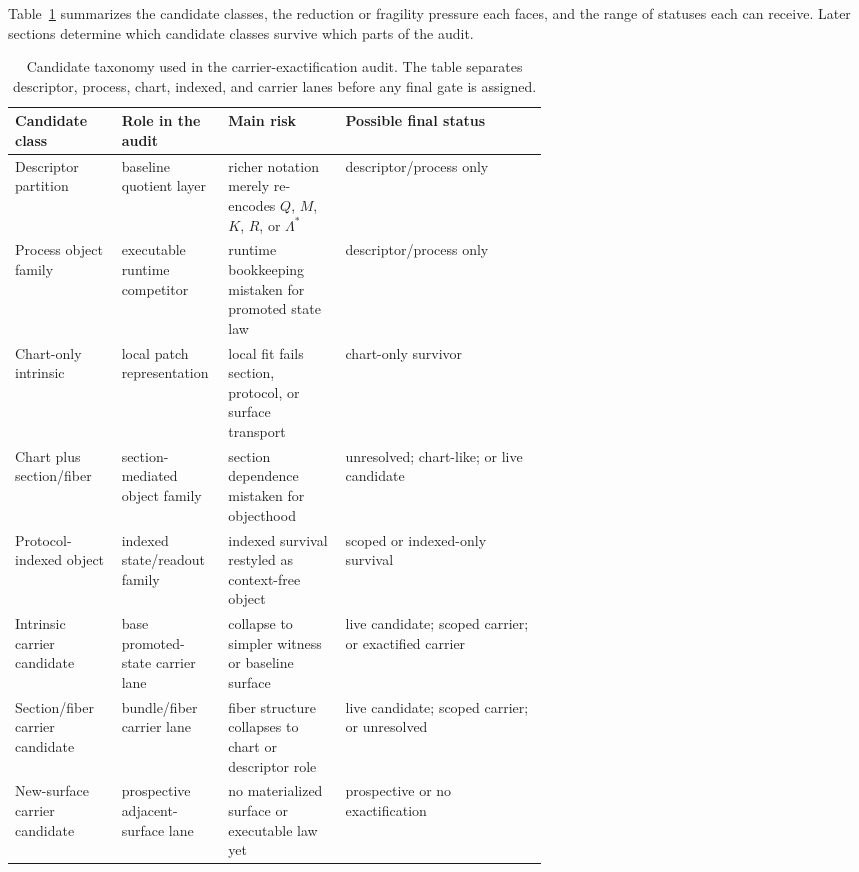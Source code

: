 \documentclass[11pt]{article}
\theoremstyle{definition}
\begin{document}
Table~\ref{tab:candidate-taxonomy} summarizes the candidate classes, the reduction or
fragility pressure each faces, and the range of statuses each can receive. Later
sections determine which candidate classes survive which parts of the audit.

\begin{table}[t]
\centering
\small
\caption{Candidate taxonomy used in the carrier-exactification audit. The table
separates descriptor, process, chart, indexed, and carrier lanes before any final gate
is assigned.}
\label{tab:candidate-taxonomy}
\begin{tabularx}{\linewidth}{@{}>{\raggedright\arraybackslash}p{0.20\linewidth}>{\raggedright\arraybackslash}p{0.20\linewidth}>{\raggedright\arraybackslash}p{0.22\linewidth}>{\raggedright\arraybackslash}X@{}}
\toprule
Candidate class & Role in the audit & Main risk & Possible final status \\
\midrule
Descriptor partition & baseline quotient layer & richer notation merely re-encodes $Q$, $M$, $K$, $R$, or $\Lambda^\ast$ & descriptor/process only \\
Process object family & executable runtime competitor & runtime bookkeeping mistaken for promoted state law & descriptor/process only \\
Chart-only intrinsic & local patch representation & local fit fails section, protocol, or surface transport & chart-only survivor \\
Chart plus section/fiber & section-mediated object family & section dependence mistaken for objecthood & unresolved; chart-like; or live candidate \\
Protocol-indexed object & indexed state/readout family & indexed survival restyled as context-free object & scoped or indexed-only survival \\
Intrinsic carrier candidate & base promoted-state carrier lane & collapse to simpler witness or baseline surface & live candidate; scoped carrier; or exactified carrier \\
Section/fiber carrier candidate & bundle/fiber carrier lane & fiber structure collapses to chart or descriptor role & live candidate; scoped carrier; or unresolved \\
New-surface carrier candidate & prospective adjacent-surface lane & no materialized surface or executable law yet & prospective or no exactification \\
\bottomrule
\end{tabularx}
\end{table}
\end{document}
